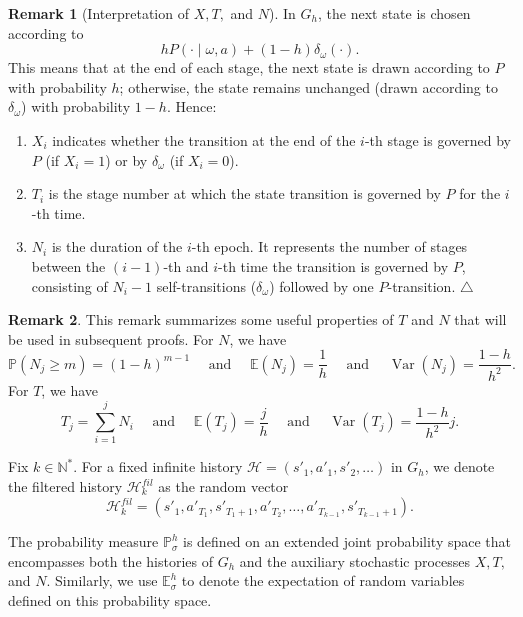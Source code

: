 \documentclass[english,openary,11pt]{article}
\newcommand\xqed[1]{%
  \leavevmode\unskip\penalty9999 \hbox{}\nobreak\hfill
  \quad\hbox{#1}}
\newcommand\demo{\xqed{$\triangle$}}
\newcommand{\demoo}{\tag*{$\triangle$}}
\theoremstyle{definition}
\newtheorem{remark}{Remark}
\newcommand{\N}{\mathbb{N}}
\newcommand{\E}{\mathbb{E}}
\renewcommand{\P}{\mathbb{P}}
\begin{document}
\begin{remark}[Interpretation of $X, T,$ and $N$]
In $G_h$, the next state is chosen according to $$h P(\cdot \mid \omega, a) + (1-h) \delta_\omega (\cdot).$$
This means that at the end of each stage, the next state is drawn according to $P$ with probability $h$; otherwise, the state remains unchanged (drawn according to $\delta_\omega$) with probability $1-h$. Hence:
\begin{enumerate}
	\item $X_i$ indicates whether the transition at the end of the $i$-th stage is governed by $P$ (if $X_i = 1$) or by $\delta_\omega$ (if $X_i = 0$).
	\item $T_i$ is the stage number at which the state transition is governed by $P$ for the $i$-th time.
	\item $N_i$ is the duration of the $i$-th epoch. It represents the number of stages between the $(i-1)$-th and $i$-th time the transition is governed by $P$, consisting of $N_i - 1$ self-transitions ($\delta_\omega$) followed by one $P$-transition. \demo
\end{enumerate}
\end{remark}

\begin{remark}
This remark summarizes some useful properties of $T$ and $N$ that will be used in subsequent proofs. For $N$, we have
$$\P(N_j \ge m) = (1-h)^{m-1} \quad \text{ and } \quad \E(N_j) = \frac 1 h \quad \text{ and } \quad \operatorname{Var}(N_j) = \frac{1-h}{h^2}.$$
For $T$, we have
\[T_j = \sum_{i = 1}^{j} N_i \quad \text{ and } \quad \E(T_j) = \frac j h \quad \text{ and } \quad \operatorname{Var}(T_j) = \frac{1-h}{h^2} j. \demoo \]
\end{remark}

Fix $k \in \N^*$. For a fixed infinite history $\mathcal H = (s'_1, a'_1, s'_2, \ldots)$ in $G_h$, 
we denote the filtered history $\mathcal H^{fil}_k$ as the random vector $$\mathcal H^{fil}_k = (s'_1, a'_{T_1}, s'_{T_1 + 1}, a'_{T_2}, \ldots, a'_{T_{k-1}}, s'_{T_{k-1}+1}).$$ 

The probability measure $\P_\sigma^h$ is defined on an extended joint probability space that encompasses both the histories of $G_h$ and the auxiliary stochastic processes $X, T,$ and $N$.
Similarly, we use $\E_\sigma^h$ to denote the expectation of random variables defined on this probability space.
\end{document}
